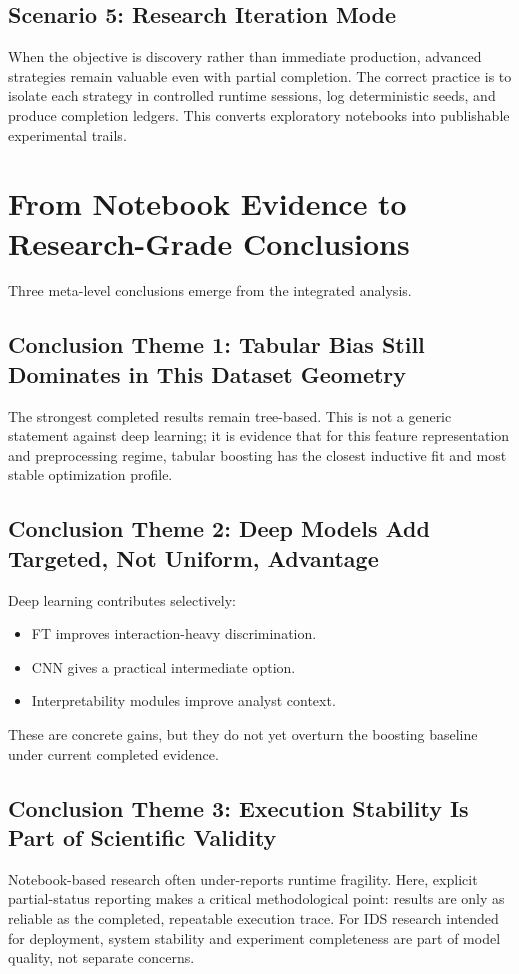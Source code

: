 \documentclass[10pt,journal]{IEEEtran}
\begin{document}
\subsection{Scenario 5: Research Iteration Mode}
When the objective is discovery rather than immediate production, advanced strategies remain valuable even with partial completion. The correct practice is to isolate each strategy in controlled runtime sessions, log deterministic seeds, and produce completion ledgers. This converts exploratory notebooks into publishable experimental trails.

\section{From Notebook Evidence to Research-Grade Conclusions}
Three meta-level conclusions emerge from the integrated analysis.

\subsection{Conclusion Theme 1: Tabular Bias Still Dominates in This Dataset Geometry}
The strongest completed results remain tree-based. This is not a generic statement against deep learning; it is evidence that for this feature representation and preprocessing regime, tabular boosting has the closest inductive fit and most stable optimization profile.

\subsection{Conclusion Theme 2: Deep Models Add Targeted, Not Uniform, Advantage}
Deep learning contributes selectively:
\begin{itemize}
\item FT improves interaction-heavy discrimination.
\item CNN gives a practical intermediate option.
\item Interpretability modules improve analyst context.
\end{itemize}
These are concrete gains, but they do not yet overturn the boosting baseline under current completed evidence.

\subsection{Conclusion Theme 3: Execution Stability Is Part of Scientific Validity}
Notebook-based research often under-reports runtime fragility. Here, explicit partial-status reporting makes a critical methodological point: results are only as reliable as the completed, repeatable execution trace. For IDS research intended for deployment, system stability and experiment completeness are part of model quality, not separate concerns.
\end{document}

